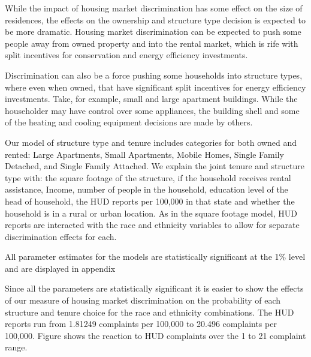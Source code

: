 \documentclass{article}
\begin{document}
While the impact of housing market discrimination has some effect on the size of residences, the effects on the ownership and structure type decision is expected to be more dramatic.  Housing market discrimination can be expected to push some people away from owned property and into the rental market, which is rife with split incentives for conservation and energy efficiency investments.  

Discrimination can also be a force pushing some households into structure types, where even when owned, that have significant split incentives for energy efficiency investments.  Take, for example, small and large apartment buildings.  While the householder may have control over some appliances, the building shell and some of the heating and cooling equipment decisions are made by others.  

Our model of structure type and tenure includes categories for both owned and rented: Large Apartments, Small Apartments, Mobile Homes, Single Family Detached, and Single Family Attached.  We explain the joint tenure and structure type with: the square footage of the structure, if the household receives rental assistance, Income, number of people in the household, education level of the head of household, the HUD reports per 100,000 in that state and whether the household is in a rural or urban location.  As in the square footage model, HUD reports are interacted with the race and ethnicity variables to allow for separate discrimination effects for each.


All parameter estimates for the models are statistically significant at the 1\% level and are displayed in appendix 


Since all the parameters are statistically significant it is easier to show the effects of our measure of housing market discrimination on the probability of each structure and tenure choice for the race and ethnicity combinations.  The HUD reports run from 1.81249 complaints per 100,000 to 20.496 complaints per 100,000.  Figure 
shows the reaction to HUD complaints over the 1 to 21 complaint range.


% 
% 
% 
\end{document}
